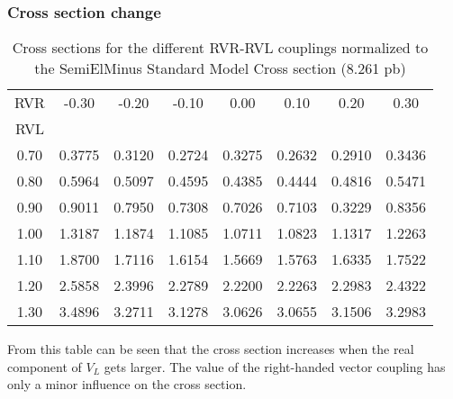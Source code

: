 \documentclass[a4paper,12pt]{report}
\begin{document}
\subsubsection{Cross section change}
\begin{table}[h!] 
 \begin{tabular}{c|c c c c c c c} 
  RVR &  -0.30  &  -0.20  &  -0.10  &  0.00  &  0.10  &  0.20  &   0.30  \\  
  RVL & & & & & & & \\ 
  \hline 
  0.70  & 0.3775 &  0.3120  & 0.2724  & 0.3275  & 0.2632  & 0.2910 &  0.3436  \\ 
  0.80  & 0.5964 &  0.5097  & 0.4595  & 0.4385  & 0.4444  & 0.4816 &  0.5471  \\ 
  0.90  & 0.9011 &  0.7950  & 0.7308  & 0.7026  & 0.7103  & 0.3229 &  0.8356  \\ 
  1.00  & 1.3187 &  1.1874  & 1.1085  & 1.0711  & 1.0823  & 1.1317 &  1.2263  \\ 
  1.10  & 1.8700 &  1.7116  & 1.6154  & 1.5669  & 1.5763  & 1.6335 &  1.7522  \\ 
  1.20  & 2.5858 &  2.3996  & 2.2789  & 2.2200  & 2.2263  & 2.2983 &  2.4322  \\ 
  1.30  & 3.4896 &  3.2711  & 3.1278  & 3.0626  & 3.0655  & 3.1506 &  3.2983  \\ 
 \end{tabular} 
 \caption{Cross sections for the different RVR-RVL couplings normalized to the SemiElMinus Standard Model Cross section (8.261 pb)} 
\end{table}
From this table can be seen that the cross section increases when the real component of $V_L$ gets larger. The value of the right-handed vector coupling has only a minor influence on the cross section.
\end{document}
